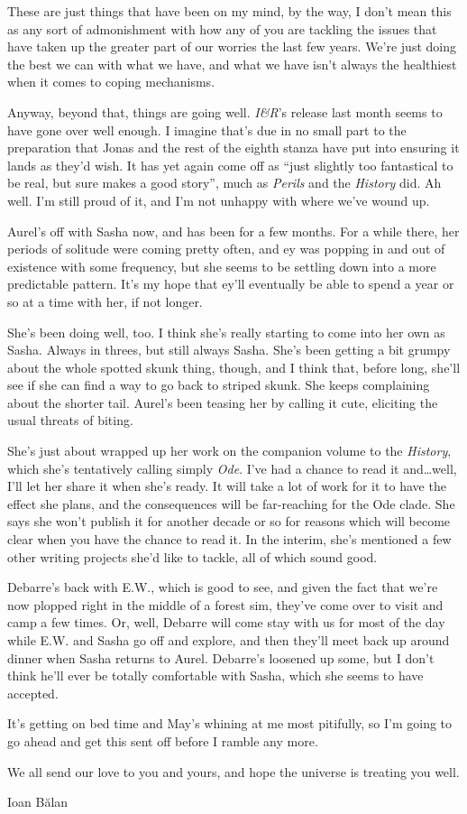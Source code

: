 These are just things that have been on my mind, by the way, I don't mean this as any sort of admonishment with how any of you are tackling the issues that have taken up the greater part of our worries the last few years. We're just doing the best we can with what we have, and what we have isn't always the healthiest when it comes to coping mechanisms.

Anyway, beyond that, things are going well. \emph{I\&R}'s release last month seems to have gone over well enough. I imagine that's due in no small part to the preparation that Jonas and the rest of the eighth stanza have put into ensuring it lands as they'd wish. It has yet again come off as ``just slightly too fantastical to be real, but sure makes a good story'', much as \emph{Perils} and the \emph{History} did. Ah well. I'm still proud of it, and I'm not unhappy with where we've wound up.

Aurel's off with Sasha now, and has been for a few months. For a while there, her periods of solitude were coming pretty often, and ey was popping in and out of existence with some frequency, but she seems to be settling down into a more predictable pattern. It's my hope that ey'll eventually be able to spend a year or so at a time with her, if not longer.

She's been doing well, too. I think she's really starting to come into her own as Sasha. Always in threes, but still always Sasha. She's been getting a bit grumpy about the whole spotted skunk thing, though, and I think that, before long, she'll see if she can find a way to go back to striped skunk. She keeps complaining about the shorter tail. Aurel's been teasing her by calling it cute, eliciting the usual threats of biting.

She's just about wrapped up her work on the companion volume to the \emph{History}, which she's tentatively calling simply \emph{Ode}. I've had a chance to read it and\ldots well, I'll let her share it when she's ready. It will take a lot of work for it to have the effect she plans, and the consequences will be far-reaching for the Ode clade. She says she won't publish it for another decade or so for reasons which will become clear when you have the chance to read it. In the interim, she's mentioned a few other writing projects she'd like to tackle, all of which sound good.

Debarre's back with E.W., which is good to see, and given the fact that we're now plopped right in the middle of a forest sim, they've come over to visit and camp a few times. Or, well, Debarre will come stay with us for most of the day while E.W. and Sasha go off and explore, and then they'll meet back up around dinner when Sasha returns to Aurel. Debarre's loosened up some, but I don't think he'll ever be totally comfortable with Sasha, which she seems to have accepted.

It's getting on bed time and May's whining at me most pitifully, so I'm going to go ahead and get this sent off before I ramble any more.

We all send our love to you and yours, and hope the universe is treating you well.

Ioan Bălan
